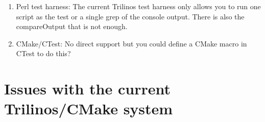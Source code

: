 \documentclass[pdf,ps2pdf,11pt]{SANDreport}
\begin{document}
\begin{enumerate}
\begin{enumerate}
\begin{enumerate}
    {}\item Perl test harness: The current Trilinos test harness only
    allows you to run one script as the test or a single grep of the
    console output.  There is also the compareOutput that is not
    enough.

    {}\item CMake/CTest: No direct support but you could define a
    CMake macro in CTest to do this?

    \end{enumerate}

  \end{enumerate}

\end{enumerate}



%
\section{Issues with the current Trilinos/CMake system}
%
\end{document}
